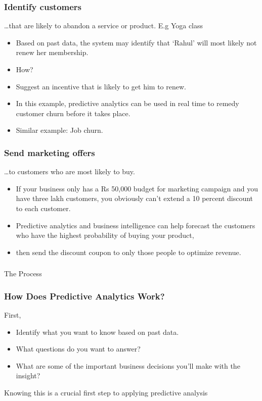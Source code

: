 \begin{frame}\frametitle{Identify customers}
\ldots that are likely to abandon a service or product. E.g Yoga class

\begin{itemize}
\item Based on past data, the system may identify that `Rahul' will most likely not renew her membership.
\item How?
\item Suggest an incentive that is likely to get him to renew.
\item In this example, predictive analytics can be used in real time to remedy customer churn before it takes place.
\item Similar example: Job churn.
\end{itemize}

\end{frame}

\begin{frame}\frametitle{Send marketing offers}
\ldots to customers who are most likely to buy.

\begin{itemize}
\item If your business only has a Rs 50,000 budget for marketing campaign and you have three lakh  customers, you obviously can’t extend a 10 percent discount to each customer. 
\item Predictive analytics and business intelligence can help forecast the customers who have the highest probability of buying your product, 
\item then send the discount coupon to only those people to optimize revenue.
\end{itemize}

\end{frame}

\begin{frame}[fragile]\frametitle{}
\begin{center}
{\Large The Process}
\end{center}
\end{frame}



\begin{frame}\frametitle{How Does Predictive Analytics Work?}
First, 
\begin{itemize}
\item Identify what you want to know based on past data.
\item What questions do you want to answer? 
\item What are some of the important business decisions you’ll make with the insight? 
\end{itemize}
Knowing this is a crucial first step to applying predictive analysis
\end{frame}


